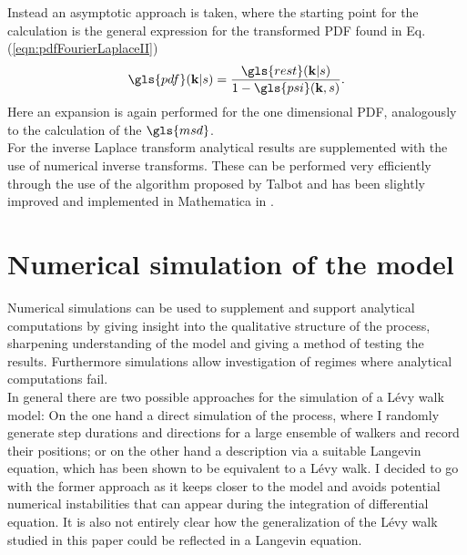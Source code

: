 Instead an asymptotic approach is taken, where the starting point for the calculation is the general expression for the transformed \gls{PDF} found in  Eq. (\ref{eqn:pdfFourierLaplaceII})
%
\begin{align}
\gls{pdf}(\ve{k}|s) = \frac{ \gls{rest}(\ve{k}|s)}{1 - \gls{psi}(\ve{k},s)}  .
\end{align}
%
Here an expansion is again performed for the one dimensional PDF, analogously to the calculation of the $\gls{msd}$. \\
For the inverse Laplace transform analytical results are supplemented with the use of numerical inverse transforms. These can be performed very efficiently through the use of the algorithm proposed by Talbot \cite{talbot1979} and has been slightly improved and implemented in Mathematica in \cite{abate2004}.


\section{Numerical simulation of the model}

Numerical simulations can be used to supplement and support analytical computations by giving insight into the qualitative structure of the process, sharpening understanding of the model and giving a method of testing the results. Furthermore simulations allow investigation of regimes where analytical computations fail.\\
{\color{blue}
In general there are two possible approaches for the simulation of a L\'evy walk model: On the one hand a direct simulation of the process, where I randomly generate step durations and directions for a large ensemble of walkers and record their positions; or on the other hand a description via a suitable Langevin equation, which has been shown to be equivalent to a L\'evy walk. 
I decided to go with the former approach as it keeps closer to the model and avoids potential numerical instabilities that can appear during the integration of differential equation. It is also not entirely clear how the generalization of the L\'evy walk studied in this paper could be reflected in a Langevin equation. \\
}

